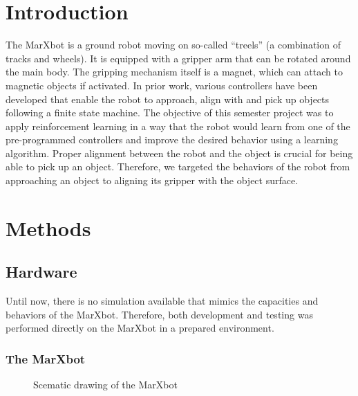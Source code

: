 %
%   
%

\chapter{Introduction}
The MarXbot is a ground robot moving on so-called ``treels'' (a combination of tracks and wheels). It is equipped with a gripper arm that can be rotated around the main body. The gripping mechanism itself is a magnet, which can attach to magnetic objects if activated. In prior work, various controllers have been developed that enable the robot to approach, align with and pick up objects following a finite state machine. The objective of this semester project was to apply reinforcement learning in a way that the robot would learn from one of the pre-programmed controllers and improve the desired behavior using a learning algorithm. Proper alignment between the robot and the object is crucial for being able to pick up an object. Therefore, we targeted the behaviors of the robot from approaching an object to aligning its gripper with the object surface.

\chapter{Methods}

\section{Hardware}
Until now, there is no simulation available that mimics the capacities and behaviors of the MarXbot. Therefore, both development and testing was performed directly on the MarXbot in a prepared environment.

\subsection{The MarXbot}
\begin{figure}
    \centering
    \def\svgwidth{0.5 \textwidth}
    
    \caption{Scematic drawing of the MarXbot}
    \label{fig:marxbot_scematic}
\end{figure}

